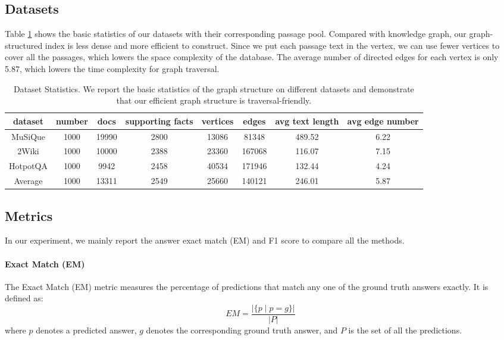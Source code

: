 \subsection{Datasets}
\label{dataset}
Table \ref{tab:dataset_statistics} shows the basic statistics of our datasets with their corresponding passage pool. Compared with knowledge graph, our graph-structured index is less dense and more efficient to construct. Since we put each passage text in the vertex, we can use fewer vertices to cover all the passages, which lowers the space complexity of the database. The average number of directed edges for each vertex is only 5.87, which lowers the time complexity for graph traversal. 
\begin{table}[ht]
    \centering
    \setlength{\tabcolsep}{2pt}
    \begin{tabular}{cccccccc}
        \toprule
        dataset& number& docs &supporting facts& vertices& edges&  
avg text 
 length
& avg edge number\\
        \midrule
        MuSiQue & 1000 &   19990 &2800 &  13086 &  81348 
&  489.52 &  6.22 
\\
        2Wiki &  1000 &   10000 
&2388 &  23360 &  167068 
&  116.07 &  7.15 
\\
        HotpotQA & 1000 &   9942 
&2458 &  40534 &  171946 
&  132.44 &  4.24 
\\
        Average & 1000 &   13311 &2549 &  25660 &  140121 &  246.01 &  5.87 \\
        \bottomrule
    \end{tabular}
    \caption{Dataset Statistics. We report the basic statistics of the graph structure on different datasets and demonstrate that our efficient graph structure is traversal-friendly.}
    \label{tab:dataset_statistics}
\end{table}
\subsection{Metrics}
\label{metric}

In our experiment, we mainly report the answer exact match (EM) and F1 score to compare all the methods.

     \paragraph{Exact Match (EM)} 
    The Exact Match (EM) metric measures the percentage of predictions that match any one of the ground truth answers exactly. It is defined as:
    \[
    EM = \frac{|\{ p \mid p = g \} |}{| P |}
    \]
    where \( p \) denotes a predicted answer, \( g \) denotes the corresponding ground truth answer, and \( P \) is the set of all the predictions.

